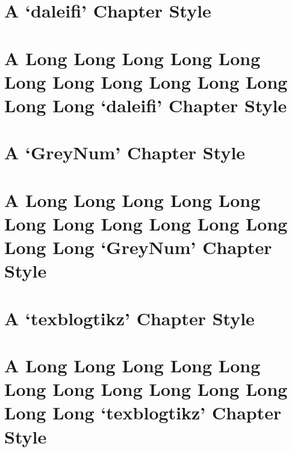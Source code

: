 \documentclass[10pt,a4paper,extrafontsizes,oldfontcommands,oneside]{memoir}
\begin{document}


\chapter{A `daleifi' Chapter Style} %
\label{chap:a_daleifi_chapter_style}



\chapter{A Long Long Long Long Long Long Long Long Long Long Long Long Long `daleifi' Chapter Style} %
\label{chap:a_long_daleifi_chapter_style}



\chapter{A `GreyNum' Chapter Style} %
\label{chap:a_GreyNum_chapter_style}



\chapter{A Long Long Long Long Long Long Long Long Long Long Long Long Long `GreyNum' Chapter Style} %
\label{chap:a_long_GreyNum_chapter_style}



\chapter{A `texblogtikz' Chapter Style} %
\label{chap:a_texblogtikz_chapter_style}



\chapter{A Long Long Long Long Long Long Long Long Long Long Long Long Long `texblogtikz' Chapter Style} %
\label{chap:a_long_texblogtikz_chapter_style}
\end{document}
